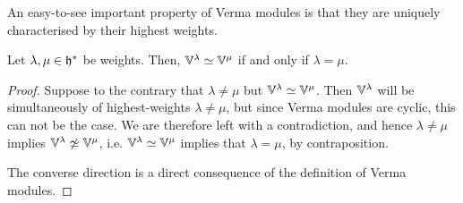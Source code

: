         An easy-to-see important property of Verma modules is that they are uniquely characterised by their highest weights. 
        \begin{proposition} \label{prop: highest_weights_determine_verma_modules}
            Let $\lambda, \mu \in \mathfrak{h}^*$ be weights. Then, $\mathbb{V}^{\lambda} \simeq \mathbb{V}^{\mu}$ if and only if $\lambda = \mu$.  
        \end{proposition}
            \begin{proof}
                Suppose to the contrary that $\lambda \not = \mu$ but $\mathbb{V}^{\lambda} \simeq \mathbb{V}^{\mu}$. Then $\mathbb{V}^{\lambda}$ will be simultaneously of highest-weights $\lambda \not = \mu$, but since Verma modules are cyclic, this can not be the case. We are therefore left with a contradiction, and hence $\lambda \not = \mu$ implies $\mathbb{V}^{\lambda} \not \simeq \mathbb{V}^{\mu}$, i.e. $\mathbb{V}^{\lambda} \simeq \mathbb{V}^{\mu}$ implies that $\lambda = \mu$, by contraposition.

                The converse direction is a direct consequence of the definition of Verma modules. 
            \end{proof}
        
